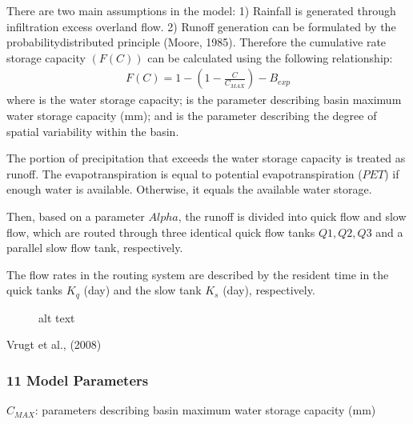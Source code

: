 \documentclass[letterpaper,10pt,english]{book}
\let\sphinxpxdimen\pdfpxdimen\else\newdimen\sphinxpxdimen
\begin{document}
\sphinxAtStartPar
There are two main assumptions in the model: 1) Rainfall is generated
through infiltration excess overland flow. 2) Runoff generation can be
formulated by the probability\sphinxhyphen{}distributed principle (Moore, 1985).
Therefore the cumulative rate storage capacity \((F(C))\) can be
calculated using the following relationship:
\begin{equation*}
\begin{split}F(C) = 1 - (1 - \frac{C}{C_{MAX}})-{B_{exp}}\end{split}
\end{equation*}
\sphinxAtStartPar
where  is the water storage capacity;  is
the parameter describing basin maximum water storage capacity (mm); and
 is the parameter describing the degree of spatial
variability within the basin.

\sphinxAtStartPar
The portion of precipitation that exceeds the water storage capacity is
treated as runoff. The evapotranspiration is equal to potential
evapotranspiration (\(PET\)) if enough water is available.
Otherwise, it equals the available water storage.

\sphinxAtStartPar
Then, based on a parameter \(Alpha\), the runoff is divided into
quick flow and slow flow, which are routed through three identical quick
flow tanks \(Q1, Q2, Q3\) and a parallel slow flow tank,
respectively.

\sphinxAtStartPar
The flow rates in the routing system are described by the resident time
in the quick tanks \(K_q\) (day) and the slow tank \(K_s\)
(day), respectively.

\begin{figure}[htbp]
\centering
\capstart

\noindent\sphinxincludegraphics[width=850\sphinxpxdimen,height=270\sphinxpxdimen]{{hymod}.png}
\caption{alt text}\label{\detokenize{A2_Jupyter_Notebooks:id9}}\end{figure}

\sphinxAtStartPar
Vrugt et al., (2008)


\subsubsection{1\sphinxhyphen{}1 Model Parameters}
\label{\detokenize{A2_Jupyter_Notebooks:model-parameters}}
\sphinxAtStartPar
\(C_{MAX}\): parameters describing basin maximum water storage
capacity (mm)
\end{document}
